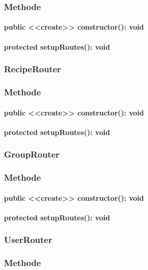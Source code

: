 \documentclass[parskip=full]{scrartcl}
\begin{document}
\subsubsection*{Methode}
\paragraph{public <<create>> constructor(): void}
\paragraph{protected setupRoutes(): void}

\subsubsection{RecipeRouter}
\subsubsection*{Methode}
\paragraph{public <<create>> constructor(): void}
\paragraph{protected setupRoutes(): void}

\subsubsection{GroupRouter}
\subsubsection*{Methode}
\paragraph{public <<create>> constructor(): void}
\paragraph{protected setupRoutes(): void}

\subsubsection{UserRouter}
\subsubsection*{Methode}
\end{document}
